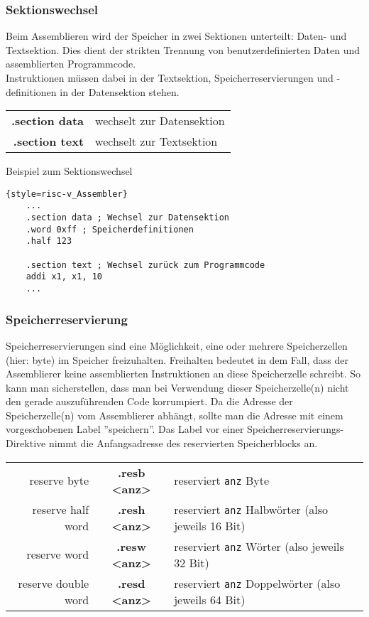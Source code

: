 \subsubsection{Sektionswechsel}
Beim Assemblieren wird der Speicher in zwei Sektionen unterteilt: Daten- und
Textsektion. Dies dient der strikten Trennung von benutzerdefinierten Daten und
assemblierten Programmcode.\\
Instruktionen müssen dabei in der Textsektion, Speicherreservierungen
und -definitionen in der Datensektion stehen.

\begin{centering}
	\begin{tabular}{rl}
		\textbf{.section data} & wechselt zur Datensektion\\
		\textbf{.section text} & wechselt zur Textsektion\\
	\end{tabular}
\end{centering}

\begin{exampleblock}{Beispiel zum Sektionswechsel}
	\begin{lstlisting}{style=risc-v_Assembler}
	...
	.section data ; Wechsel zur Datensektion
	.word 0xff ; Speicherdefinitionen
	.half 123
	
	.section text ; Wechsel zurück zum Programmcode
	addi x1, x1, 10
	...
	\end{lstlisting}
\end{exampleblock}

\subsubsection{Speicherreservierung}
Speicherreservierungen sind eine Möglichkeit, eine oder mehrere Speicherzellen (hier: byte) im Speicher freizuhalten. Freihalten bedeutet in dem Fall, dass der Assemblierer keine assemblierten Instruktionen an diese Speicherzelle schreibt.
So kann man sicherstellen, dass man bei Verwendung dieser Speicherzelle(n) nicht den gerade auszuführenden Code korrumpiert.
Da die Adresse der Speicherzelle(n) vom Assemblierer abhängt, sollte man die Adresse mit einem vorgeschobenen Label ''speichern''. Das Label vor einer Speicherreservierungs-Direktive nimmt die Anfangsadresse des reservierten Speicherblocks an.\\

\begin{centering}
	\begin{tabular}{rcl}
		reserve byte & \textbf{.resb <anz>} & reserviert \texttt{anz} Byte\\
		reserve half word & \textbf{.resh <anz>} & reserviert \texttt{anz} Halbwörter (also jeweils 16 Bit)\\
		reserve word & \textbf{.resw <anz>} & reserviert \texttt{anz} Wörter (also jeweils 32 Bit)\\
		reserve double word & \textbf{.resd <anz>} & reserviert \texttt{anz} Doppelwörter (also jeweils 64 Bit)\\
	\end{tabular}
\end{centering}


